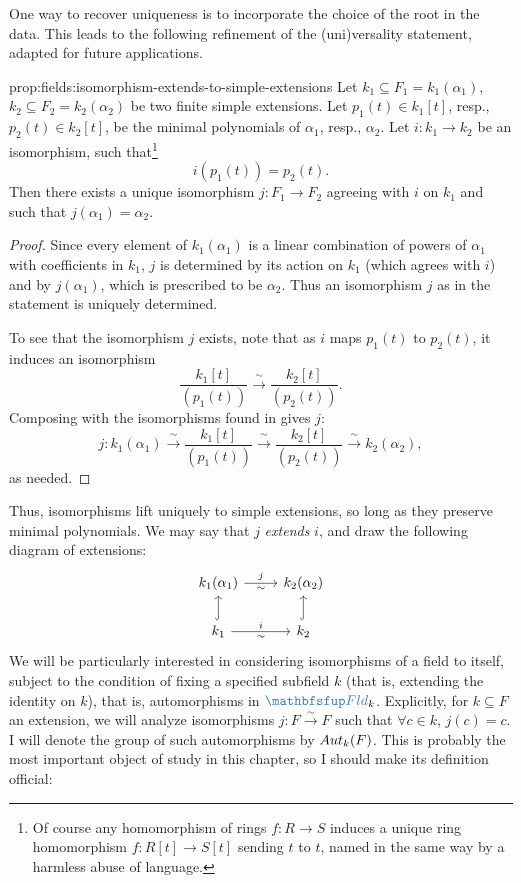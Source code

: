 One way to recover uniqueness is to incorporate the choice of the root
in the data. This leads to the following refinement of the
(uni)versality statement, adapted for future applications.
\begin{prop}{}{prop:fields:isomorphism-extends-to-simple-extensions}
  Let $k_1 \subseteq F_1 = k_1(\alpha_1)$,
  $k_2 \subseteq F_2 = k_2(\alpha_2)$ be two finite simple
  extensions. Let $p_1(t) \in k_1[t]$, resp., $p_2(t) \in k_2[t]$, be
  the minimal polynomials of $\alpha_1$, resp., $\alpha_2$.  Let
  $i : k_1 \to k_2$ be an isomorphism, such that\footnote{Of course
    any homomorphism of rings $f : R \to S$ induces a unique ring
    homomorphism $f : R[t] \to S[t]$ sending $t$ to $t$, named in the
    same way by a harmless abuse of language.}
  \[i(p_1(t)) = p_2(t).\] Then there exists a unique isomorphism
  $j : F_1 \to F_2$ agreeing with $i$ on $k_1$ and such that
  $j(\alpha_1) = \alpha_2$.
\end{prop}
\begin{proof}
  Since every element of $k_1(\alpha_1)$ is a linear combination of
  powers of $\alpha_1$ with coefficients in $k_1$, $j$ is determined
  by its action on $k_1$ (which agrees with $i$) and by $j(\alpha_1)$,
  which is prescribed to be $\alpha_2$. Thus an isomorphism $j$ as in
  the statement is uniquely determined.

  To see that the isomorphism $j$ exists, note that as $i$ maps
  $p_1(t)$ to $p_2(t)$, it induces an isomorphism
  \[\frac{k_1[t]}{(p_1(t))} \xrightarrow{\;\sim\;}
    \frac{k_2[t]}{(p_2(t))}.\] Composing with the isomorphisms found
  in  gives $j$:
  \[j : k_1(\alpha_1) \xrightarrow{\;\sim\;} \frac{k_1[t]}{(p_1(t))}
    \xrightarrow{\;\sim\;} \frac{k_2[t]}{(p_2(t))}
    \xrightarrow{\;\sim\;} k_2(\alpha_2),\] as needed.
\end{proof}
Thus, isomorphisms lift uniquely to simple extensions, so long as they
preserve minimal polynomials. We may say that $j$ \emph{extends} $i$,
and draw the following diagram of extensions:
\[\begin{tikzcd}
    k_1(\alpha_1) \arrow[r, "j", "\sim"'] & k_2(\alpha_2) \\
    k_1 \arrow[u, hook] \arrow[r, "i", "\sim"'] & k_2 \arrow[u, hook]
  \end{tikzcd}\] We will be particularly interested in considering
isomorphisms of a field to itself, subject to the condition of fixing
a specified subfield $k$ (that is, extending the identity on $k$),
that is, automorphisms in $\categ{Fld}_k$. Explicitly, for
$k \subseteq F$ an extension, we will analyze isomorphisms
$j : F \xrightarrow{\sim} F$ such that $\forall c \in k$, $j(c) =
c$. I will denote the group of such automorphisms by $Aut_k(F)$. This
is probably the most important object of study in this chapter, so I
should make its definition official:

